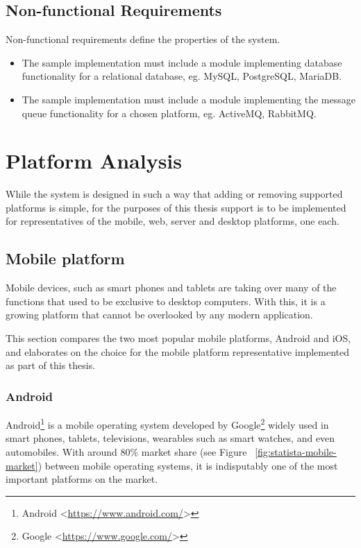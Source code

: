 \subsection{Non-functional Requirements}
Non-functional requirements define the properties of the system.
\begin{itemize}
\item The sample implementation must include a module implementing database functionality for a relational database, eg. MySQL, PostgreSQL, MariaDB.
\item The sample implementation must include a module implementing the message queue functionality for a chosen platform, eg. ActiveMQ, RabbitMQ.
\end{itemize}

\section{Platform Analysis}

While the system is designed in such a way that adding or removing supported platforms is simple, for the purposes of this thesis support is to be implemented for representatives of the mobile, web, server and desktop platforms, one each.

\subsection{Mobile platform}
Mobile devices, such as smart phones and tablets are taking over many of the functions that used to be exclusive to desktop computers. With this, it is a growing platform that cannot be overlooked by any modern application.

This section compares the two most popular mobile platforms, Android and iOS, and elaborates on the choice for the mobile platform representative implemented as part of this thesis.

\subsubsection{Android}
Android\footnote{Android <\url{https://www.android.com/}>} is a mobile operating system developed by Google\footnote{Google <\url{https://www.google.com/}>} widely used in smart phones, tablets, televisions, wearables such as smart watches, and even automobiles. With around 80\% market share (see Figure ~\ref{fig:statista-mobile-market}) between mobile operating systems, it is indisputably one of the most important platforms on the market.

